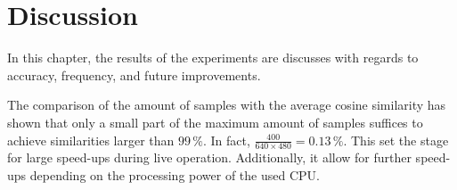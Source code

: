 \chapter{Discussion}
\label{chap:discussion}

In this chapter, the results of the experiments are discusses with regards to accuracy, frequency, and future improvements.

The comparison of the amount of samples with the average cosine
similarity has shown that only a small part of the maximum amount of
samples suffices to achieve similarities larger than $99\,\%$. In
fact, $\frac{400}{640 \times 480} = 0.13\,\%$. This set the stage for
large speed-ups during live operation. Additionally, it allow for further speed-ups depending on the processing power of the used
CPU.

